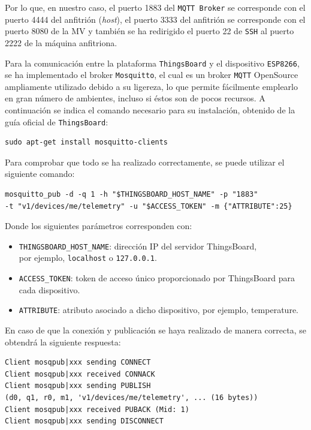 Por lo que, en nuestro caso, el puerto 1883 del \texttt{MQTT Broker} se corresponde con el puerto 4444 del anfitrión (\textit{host}), el puerto 3333 del anfitrión se corresponde con el puerto 8080 de la MV y también se ha redirigido el puerto 22 de \texttt{SSH} al puerto 2222 de la máquina anfitriona.

Para la comunicación entre la plataforma \texttt{ThingsBoard} y el dispositivo \texttt{ESP8266}, se ha implementado el broker \texttt{Mosquitto}, el cual es un broker \texttt{MQTT} OpenSource ampliamente utilizado debido a su ligereza, lo que permite fácilmente emplearlo en gran número de ambientes, incluso si éstos son de pocos recursos. A continuación se indica el comando necesario para su instalación, obtenido de la guía oficial de \texttt{ThingsBoard}: \cite{thingsboardMQTTDeviceAPI}

\begin{verbatim}
sudo apt-get install mosquitto-clients
\end{verbatim}

Para comprobar que todo se ha realizado correctamente, se puede utilizar el siguiente comando:
\begin{verbatim}
mosquitto_pub -d -q 1 -h "$THINGSBOARD_HOST_NAME" -p "1883"
-t "v1/devices/me/telemetry" -u "$ACCESS_TOKEN" -m {"ATTRIBUTE":25}
\end{verbatim}

Donde los siguientes parámetros corresponden con:
\begin{itemize}
    \item \texttt{THINGSBOARD\_HOST\_NAME}: dirección IP del servidor ThingsBoard, \\
    por ejemplo, \texttt{localhost} o \texttt{127.0.0.1}.
    \item \texttt{ACCESS\_TOKEN}: token de acceso único proporcionado por ThingsBoard para cada dispositivo.
    \item \texttt{ATTRIBUTE}: atributo asociado a dicho dispositivo, por ejemplo, temperature.
\end{itemize}

En caso de que la conexión y publicación se haya realizado de manera correcta, se obtendrá la siguiente respuesta:
\begin{verbatim}
Client mosqpub|xxx sending CONNECT
Client mosqpub|xxx received CONNACK
Client mosqpub|xxx sending PUBLISH
(d0, q1, r0, m1, 'v1/devices/me/telemetry', ... (16 bytes))
Client mosqpub|xxx received PUBACK (Mid: 1)
Client mosqpub|xxx sending DISCONNECT
\end{verbatim}

